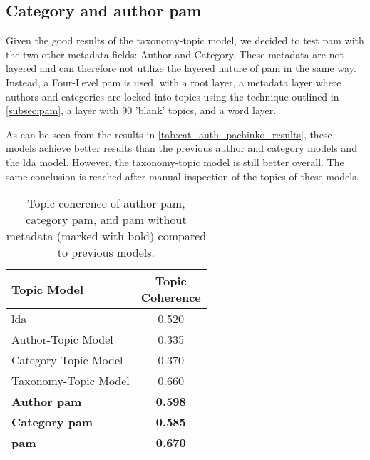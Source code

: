 \subsection{Category and author \gls{pam}}\label{app:cat_auth_pachinko}
Given the good results of the taxonomy-topic model, we decided to test \gls{pam} with the two other metadata fields: Author and Category.
These metadata are not layered and can therefore not utilize the layered nature of \gls{pam} in the same way.
Instead, a Four-Level \gls{pam} is used, with a root layer, a metadata layer where authors and categories are locked into topics using the technique outlined in \autoref{subsec:pam}, a layer with 90 'blank' topics, and a word layer.

As can be seen from the results in \autoref{tab:cat_auth_pachinko_results}, these models achieve better results than the previous author and category models and the \gls{lda} model.
However, the taxonomy-topic model is still better overall.
The same conclusion is reached after manual inspection of the topics of these models.

\begin{table}[h]
	\centering
	\caption{Topic coherence of author \gls{pam}, category \gls{pam}, and \gls{pam} without metadata (marked with bold) compared to previous models.}
	\begin{tabular}{l|c}
		Topic Model & \makecell{Topic \\ Coherence} \\
		\midrule
		\Acrlong{lda} & 0.520 \\
		Author-Topic Model & 0.335 \\
		Category-Topic Model & 0.370 \\
		Taxonomy-Topic Model & 0.660 \\
		\textbf{Author \gls{pam}} & \textbf{0.598} \\
		\textbf{Category \gls{pam}} & \textbf{0.585} \\
		\textbf{\Acrlong{pam}} & \textbf{0.670} \\
	\end{tabular}
	\label{tab:cat_auth_pachinko_results}
\end{table}


